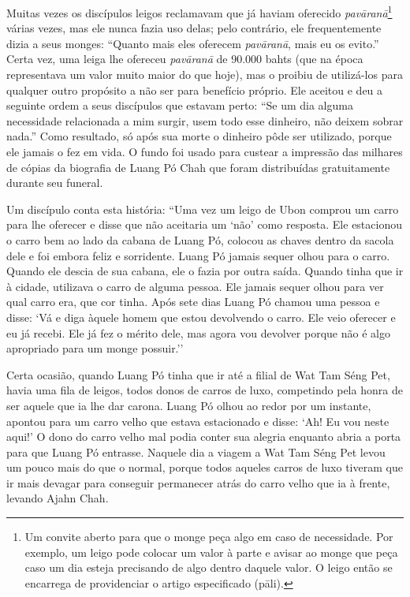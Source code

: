 Muitas vezes os discípulos leigos reclamavam que já haviam oferecido
\emph{pavāranā}\footnote{Um convite aberto para que o monge peça algo em
  caso de necessidade. Por exemplo, um leigo pode colocar um valor à
  parte e avisar ao monge que peça caso um dia esteja precisando de algo
  dentro daquele valor. O leigo então se encarrega de providenciar o
  artigo especificado (pāli).} várias vezes, mas ele nunca fazia uso
delas; pelo contrário, ele frequentemente dizia a seus monges: ``Quanto
mais eles oferecem \emph{pavāranā}, mais eu os evito.'' Certa vez, uma
leiga lhe ofereceu \emph{pavāranā} de 90.000 bahts (que na época
representava um valor muito maior do que hoje), mas o proibiu de
utilizá-los para qualquer outro propósito a não ser para benefício
próprio. Ele aceitou e deu a seguinte ordem a seus discípulos que
estavam perto: ``Se um dia alguma necessidade relacionada a mim surgir,
usem todo esse dinheiro, não deixem sobrar nada.'' Como resultado, só
após sua morte o dinheiro pôde ser utilizado, porque ele jamais o fez em
vida. O fundo foi usado para custear a impressão das milhares de cópias
da biografia de Luang Pó Chah que foram distribuídas gratuitamente
durante seu funeral.

Um discípulo conta esta história: ``Uma vez um leigo de Ubon comprou um
carro para lhe oferecer e disse que não aceitaria um `não' como
resposta. Ele estacionou o carro bem ao lado da cabana de Luang Pó,
colocou as chaves dentro da sacola dele e foi embora feliz e sorridente.
Luang Pó jamais sequer olhou para o carro. Quando ele descia de sua
cabana, ele o fazia por outra saída. Quando tinha que ir à cidade,
utilizava o carro de alguma pessoa. Ele jamais sequer olhou para ver
qual carro era, que cor tinha. Após sete dias Luang Pó chamou uma pessoa
e disse: `Vá e diga àquele homem que estou devolvendo o carro. Ele veio
oferecer e eu já recebi. Ele já fez o mérito dele, mas agora vou
devolver porque não é algo apropriado para um monge possuir.''

Certa ocasião, quando Luang Pó tinha que ir até a filial de Wat Tam Séng
Pet, havia uma fila de leigos, todos donos de carros de luxo, competindo
pela honra de ser aquele que ia lhe dar carona. Luang Pó olhou ao redor
por um instante, apontou para um carro velho que estava estacionado e
disse: `Ah! Eu vou neste aqui!' O dono do carro velho mal podia conter
sua alegria enquanto abria a porta para que Luang Pó entrasse. Naquele
dia a viagem a Wat Tam Séng Pet levou um pouco mais do que o normal,
porque todos aqueles carros de luxo tiveram que ir mais devagar para
conseguir permanecer atrás do carro velho que ia à frente, levando Ajahn
Chah.

